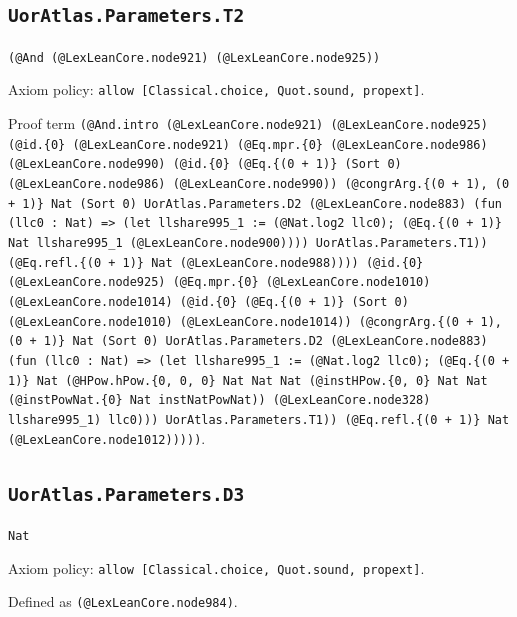 \documentclass[11pt]{article}
\begin{document}
\subsection*{\texttt{UorAtlas.Parameters.T2}}
\noindent\texttt{(@And (@LexLeanCore.node921) (@LexLeanCore.node925))}\par
\noindent Axiom policy: \texttt{allow [Classical.choice, Quot.sound, propext]}.\par
\noindent Proof term \texttt{(@And.intro (@LexLeanCore.node921) (@LexLeanCore.node925) (@id.\{0\} (@LexLeanCore.node921) (@Eq.mpr.\{0\} (@LexLeanCore.node986) (@LexLeanCore.node990) (@id.\{0\} (@Eq.\{(0 + 1)\} (Sort 0) (@LexLeanCore.node986) (@LexLeanCore.node990)) (@congrArg.\{(0 + 1), (0 + 1)\} Nat (Sort 0) UorAtlas.Parameters.D2 (@LexLeanCore.node883) (fun (llc0 : Nat) => (let llshare995\_1 := (@Nat.log2 llc0); (@Eq.\{(0 + 1)\} Nat llshare995\_1 (@LexLeanCore.node900)))) UorAtlas.Parameters.T1)) (@Eq.refl.\{(0 + 1)\} Nat (@LexLeanCore.node988)))) (@id.\{0\} (@LexLeanCore.node925) (@Eq.mpr.\{0\} (@LexLeanCore.node1010) (@LexLeanCore.node1014) (@id.\{0\} (@Eq.\{(0 + 1)\} (Sort 0) (@LexLeanCore.node1010) (@LexLeanCore.node1014)) (@congrArg.\{(0 + 1), (0 + 1)\} Nat (Sort 0) UorAtlas.Parameters.D2 (@LexLeanCore.node883) (fun (llc0 : Nat) => (let llshare995\_1 := (@Nat.log2 llc0); (@Eq.\{(0 + 1)\} Nat (@HPow.hPow.\{0, 0, 0\} Nat Nat Nat (@instHPow.\{0, 0\} Nat Nat (@instPowNat.\{0\} Nat instNatPowNat)) (@LexLeanCore.node328) llshare995\_1) llc0))) UorAtlas.Parameters.T1)) (@Eq.refl.\{(0 + 1)\} Nat (@LexLeanCore.node1012)))))}.\par
\subsection*{\texttt{UorAtlas.Parameters.D3}}
\noindent\texttt{Nat}\par
\noindent Axiom policy: \texttt{allow [Classical.choice, Quot.sound, propext]}.\par
\noindent Defined as \texttt{(@LexLeanCore.node984)}.\par
\end{document}
